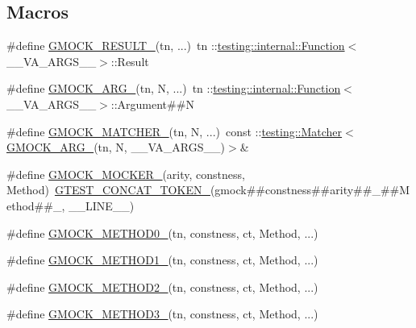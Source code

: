 \subsection*{Macros}
\begin{DoxyCompactItemize}
\item 
\#define \hyperlink{gmock-generated-function-mockers_8h_a0e9d94e9c77df84f1103af06feee1077}{G\+M\+O\+C\+K\+\_\+\+R\+E\+S\+U\+L\+T\+\_\+}(tn, ...)~tn \+::\hyperlink{structtesting_1_1internal_1_1Function}{testing\+::internal\+::\+Function}$<$\+\_\+\+\_\+\+V\+A\+\_\+\+A\+R\+G\+S\+\_\+\+\_\+$>$\+::Result
\item 
\#define \hyperlink{gmock-generated-function-mockers_8h_a887575cc1c31158fba808180a10c004f}{G\+M\+O\+C\+K\+\_\+\+A\+R\+G\+\_\+}(tn,  N, ...)~tn \+::\hyperlink{structtesting_1_1internal_1_1Function}{testing\+::internal\+::\+Function}$<$\+\_\+\+\_\+\+V\+A\+\_\+\+A\+R\+G\+S\+\_\+\+\_\+$>$\+::Argument\#\#N
\item 
\#define \hyperlink{gmock-generated-function-mockers_8h_aa87d0009fe91f1c89d658776b55a769c}{G\+M\+O\+C\+K\+\_\+\+M\+A\+T\+C\+H\+E\+R\+\_\+}(tn,  N, ...)~const \+::\hyperlink{classtesting_1_1Matcher}{testing\+::\+Matcher}$<$\hyperlink{gmock-generated-function-mockers_8h_a887575cc1c31158fba808180a10c004f}{G\+M\+O\+C\+K\+\_\+\+A\+R\+G\+\_\+}(tn, N, \+\_\+\+\_\+\+V\+A\+\_\+\+A\+R\+G\+S\+\_\+\+\_\+)$>$\&
\item 
\#define \hyperlink{gmock-generated-function-mockers_8h_a7d362499e27b1bc3a9806dd3cf58a5b7}{G\+M\+O\+C\+K\+\_\+\+M\+O\+C\+K\+E\+R\+\_\+}(arity,  constness,  Method)~\hyperlink{gtest-internal_8h_ae3c336cbe1ae2bd1b1d019333e4428a0}{G\+T\+E\+S\+T\+\_\+\+C\+O\+N\+C\+A\+T\+\_\+\+T\+O\+K\+E\+N\+\_\+}(gmock\#\#constness\#\#arity\#\#\+\_\+\#\#Method\#\#\+\_\+, \+\_\+\+\_\+\+L\+I\+N\+E\+\_\+\+\_\+)
\item 
\#define \hyperlink{gmock-generated-function-mockers_8h_ae0d290ffa58d7c624b2e3487ba1252f4}{G\+M\+O\+C\+K\+\_\+\+M\+E\+T\+H\+O\+D0\+\_\+}(tn,  constness,  ct,  Method, ...)
\item 
\#define \hyperlink{gmock-generated-function-mockers_8h_a1bc0012d62440dda77208dabdf4925c9}{G\+M\+O\+C\+K\+\_\+\+M\+E\+T\+H\+O\+D1\+\_\+}(tn,  constness,  ct,  Method, ...)
\item 
\#define \hyperlink{gmock-generated-function-mockers_8h_a885295ca6bebb15efb3fc786218c5d47}{G\+M\+O\+C\+K\+\_\+\+M\+E\+T\+H\+O\+D2\+\_\+}(tn,  constness,  ct,  Method, ...)
\item 
\#define \hyperlink{gmock-generated-function-mockers_8h_af7c77ba511c631de02bb8c45a6ed3045}{G\+M\+O\+C\+K\+\_\+\+M\+E\+T\+H\+O\+D3\+\_\+}(tn,  constness,  ct,  Method, ...)

\end{DoxyCompactItemize}
